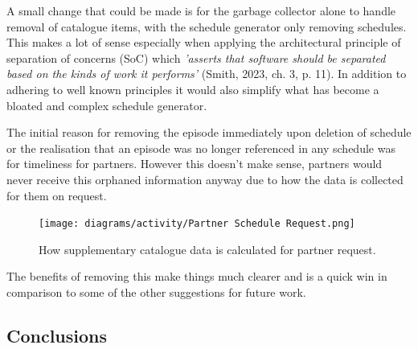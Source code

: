   A small change that could be made is for the garbage collector alone to handle removal of catalogue items, with the schedule generator only 
  removing schedules. This makes a lot of sense especially when applying the architectural principle of separation of concerns (SoC) which 
  \textit{'asserts that software should be separated based on the kinds of work it performs'} (Smith, 2023, ch. 3, p. 11). In addition to adhering 
  to well known principles it would also simplify what has become a bloated and complex schedule generator.

  The initial reason for removing the episode immediately upon deletion of schedule or the realisation that an episode was no longer referenced in 
  any schedule was for timeliness for partners. However this doesn't make sense, partners would never receive this orphaned information anyway due to 
  how the data is collected for them on request.

  \begin{figure}[H]
    \centering
    \texttt{[image: diagrams/activity/Partner Schedule Request.png]}
    \caption{How supplementary catalogue data is calculated for partner request.}
    \label{fig:partnerRequest}
  \end{figure}  

  The benefits of removing this make things much clearer and is a quick win in comparison to some of the other suggestions for future work.

  \newpage
  \subsection{Conclusions}
  \label{sec:conclusion}
  
\newpage
